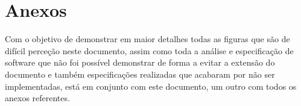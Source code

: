 \chapter{Anexos}
Com o objetivo de demonstrar em maior detalhes todas as figuras que são de difícil perceção neste documento, assim como toda a análise e especificação de software que não foi possível demonstrar de forma a evitar a extensão do documento e também especificações realizadas que acabaram por não ser implementadas, está em conjunto com este documento, um outro com todos os anexos referentes.